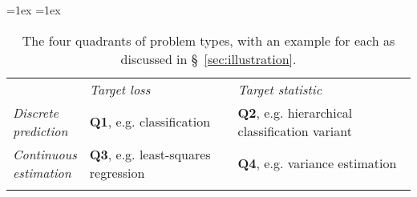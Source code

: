 \documentclass[11pt]{article} %
\begin{document}
\begin{table}[h!]
  \begin{center}
    \aboverulesep=1ex
    \belowrulesep=1ex
    \begin{tabular}{p{12ex}ll}
      & \emph{Target loss}  & \emph{Target statistic}\\
      \cmidrule[1pt]{2-3}
      \parbox{12ex}{\emph{Discrete \\ prediction}} & \textbf{Q1}, e.g. classification  & \textbf{Q2}, e.g. hierarchical classification variant\\ 
      \parbox{12ex}{\emph{Continuous \\ estimation}} & \textbf{Q3}, e.g. least-squares regression & \textbf{Q4}, e.g. variance estimation\\ 
      \\
    \end{tabular}
    \caption{The four quadrants of problem types, with an example for each as discussed in \S~\ref{sec:illustration}.}
    \label{tab:quadrants}
  \end{center}
\end{table}
\end{document}
